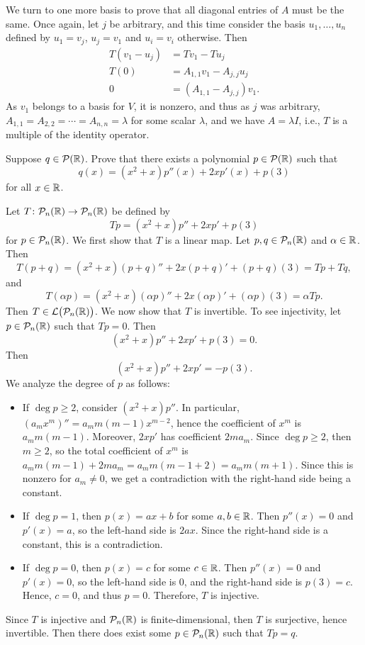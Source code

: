 \begin{exc}
\begin{solution}
We turn to one more basis to prove that all diagonal entries of $A$ must be the
same. Once again, let $j$ be arbitrary, and this time consider the basis
$u_1,\dots,u_n$ defined by $u_1=v_j$, $u_j=v_1$ and $u_i=v_i$ otherwise. Then
\begin{align*}
T(v_1-u_j) &= Tv_1-Tu_j\\
T(0) &= A_{1,1}v_1-A_{j,j}u_j\\
0 &= (A_{1,1}-A_{j,j})v_1.
\end{align*}
As $v_1$ belongs to a basis for $V$, it is nonzero, and thus as $j$ was
arbitrary, $A_{1,1}=A_{2,2}=\cdots=A_{n,n}=\lambda$ for some scalar $\lambda$,
and we have $A=\lambda I$, i.e., $T$ is a multiple of the identity operator.
\end{solution}

\begin{exercise}
Suppose $q\in\mathcal{P}(\mathbb{R})$. Prove that there exists a polynomial $p\in\mathcal{P}(\mathbb{R})$
such that
\[ q(x) = (x^2+x)p''(x)+2xp'(x)+p(3) \]
for all $x\in\mathbb{R}$.
\end{exercise}
\begin{solution}
Let $T\colon\mathcal{P}_n(\mathbb{R})\to\mathcal{P}_n(\mathbb{R})$ be defined by
\[ Tp = (x^2+x)p''+2xp'+p(3) \]
for $p\in\mathcal{P}_n(\mathbb{R})$. We first show that $T$ is a linear map. Let
$p,q\in\mathcal{P}_n(\mathbb{R})$ and $\alpha\in\mathbb{R}$. Then
\[ T(p+q) = (x^2+x)(p+q)''+2x(p+q)'+(p+q)(3) = Tp+Tq, \]
and
\[ T(\alpha p) = (x^2+x)(\alpha p)''+2x(\alpha p)'+(\alpha p)(3)
   = \alpha Tp. \]
Then $T\in\mathcal{L}\bigl(\mathcal{P}_n(\mathbb{R})\bigr)$. We now show that $T$ is invertible. To
see injectivity, let $p\in\mathcal{P}_n(\mathbb{R})$ such that $Tp=0$. Then
\[ (x^2+x)p''+2xp'+p(3) = 0. \]
Then
\[ (x^2+x)p''+2xp' = -p(3). \]
We analyze the degree of $p$ as follows:
\begin{itemize}
\item If $\deg p\ge2$, consider $(x^2+x)p''$. In particular,
  $(a_mx^m)''=a_mm(m-1)x^{m-2}$, hence the coefficient of $x^m$ is
  $a_mm(m-1)$. Moreover, $2xp'$ has coefficient $2ma_m$. Since $\deg p\ge2$,
  then $m\ge2$, so the total coefficient of $x^m$ is
  $a_mm(m-1)+2ma_m=a_mm(m-1+2)=a_mm(m+1)$. Since this is nonzero for
  $a_m\ne0$, we get a contradiction with the right-hand side being a constant.
\item If $\deg p=1$, then $p(x)=ax+b$ for some $a,b\in\mathbb{R}$. Then $p''(x)=0$ and
  $p'(x)=a$, so the left-hand side is $2ax$. Since the right-hand side is a
  constant, this is a contradiction.
\item If $\deg p=0$, then $p(x)=c$ for some $c\in\mathbb{R}$. Then $p''(x)=0$ and
  $p'(x)=0$, so the left-hand side is $0$, and the right-hand side is
  $p(3)=c$. Hence, $c=0$, and thus $p=0$. Therefore, $T$ is injective.
\end{itemize}
Since $T$ is injective and $\mathcal{P}_n(\mathbb{R})$ is finite-dimensional, then $T$ is
surjective, hence invertible. Then there does exist some $p\in\mathcal{P}_n(\mathbb{R})$ such
that $Tp=q$.
\end{solution}


\end{exc}
